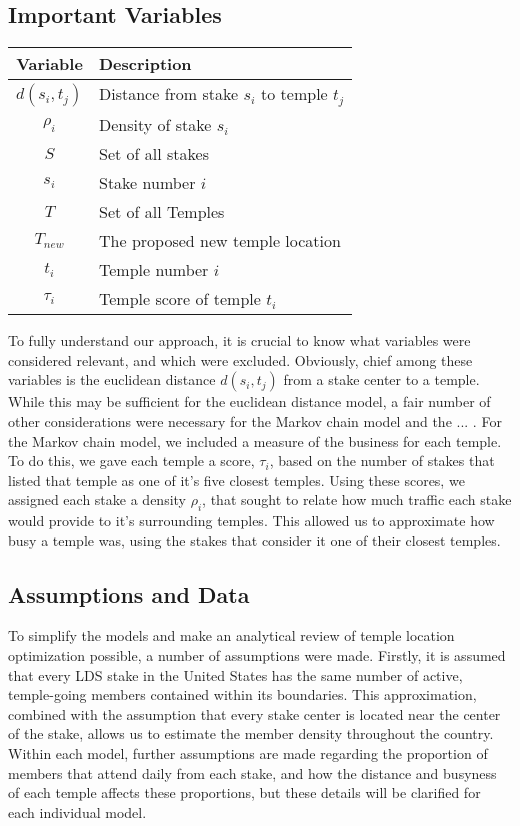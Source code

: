 \documentclass[twoside,twocolumn]{article}
\begin{document}
\subsection{Important Variables}
\begin{tabular}{c | l}
Variable & Description\\
\hline
$d(s_{i},t_{j})$ & Distance from stake $s_{i}$ to temple $t_{j}$\\
$\rho_{i}$ & Density of stake $s_{i}$\\
$S$ & Set of all stakes\\
$s_{i}$ & Stake number $i$\\
$T$ & Set of all Temples\\
$T_{new}$ & The proposed new temple location\\
$t_{i}$ & Temple number $i$ \\
$\tau_{i}$ & Temple score of temple $t_{i}$\\
\end{tabular}
To fully understand our approach, it is crucial to know what variables were considered relevant, and which were excluded.
Obviously, chief among these variables is the euclidean distance $d(s_{i},t_{j})$ from a stake center to a temple.
While this may be sufficient for the euclidean distance model, a fair number of other considerations were necessary for the Markov chain model and the ... .
For the Markov chain model, we included a measure of the business for each temple.
To do this, we gave each temple a score, $\tau_{i}$, based on the number of stakes that listed that temple as one of it's five closest temples.
Using these scores, we assigned each stake a density $\rho_{i}$, that sought to relate how much traffic each stake would provide to it's surrounding temples.
This allowed us to approximate how busy a temple was, using the stakes that consider it one of their closest temples.
\subsection{Assumptions and Data}
To simplify the models and make an analytical review of temple location optimization possible, a number of assumptions were made. Firstly, it is assumed that every LDS stake in the United States has the same number of active, temple-going members contained within its boundaries. This approximation, combined with the assumption that every stake center is located near the center of the stake, allows us to estimate the member density throughout the country. Within each model, further assumptions are made regarding the proportion of members that attend daily from each stake, and how the distance and busyness of each temple affects these proportions, but these details will be clarified for each individual model.
\end{document}
